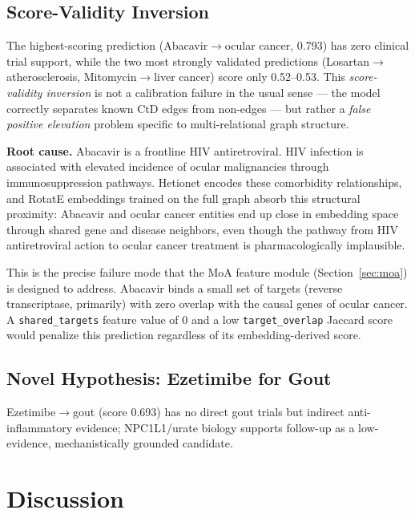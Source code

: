 \documentclass[10pt,twocolumn]{article}
\begin{document}
\subsection{Score-Validity Inversion}

The highest-scoring prediction (Abacavir$\to$ocular cancer, 0.793) has zero clinical trial support, while the two most strongly validated predictions (Losartan$\to$atherosclerosis, Mitomycin$\to$liver cancer) score only 0.52--0.53. This \textit{score-validity inversion} is not a calibration failure in the usual sense --- the model correctly separates known CtD edges from non-edges --- but rather a \textit{false positive elevation} problem specific to multi-relational graph structure.

\textbf{Root cause.} Abacavir is a frontline HIV antiretroviral. HIV infection is associated with elevated incidence of ocular malignancies through immunosuppression pathways. Hetionet encodes these comorbidity relationships, and RotatE embeddings trained on the full graph absorb this structural proximity: Abacavir and ocular cancer entities end up close in embedding space through shared gene and disease neighbors, even though the pathway from HIV antiretroviral action to ocular cancer treatment is pharmacologically implausible.

This is the precise failure mode that the MoA feature module (Section~\ref{sec:moa}) is designed to address. Abacavir binds a small set of targets (reverse transcriptase, primarily) with zero overlap with the causal genes of ocular cancer. A \texttt{shared\_targets} feature value of 0 and a low \texttt{target\_overlap} Jaccard score would penalize this prediction regardless of its embedding-derived score.

\subsection{Novel Hypothesis: Ezetimibe for Gout}

Ezetimibe$\to$gout (score 0.693) has no direct gout trials but indirect anti-inflammatory evidence; NPC1L1/urate biology supports follow-up as a low-evidence, mechanistically grounded candidate.

\section{Discussion}
\end{document}
